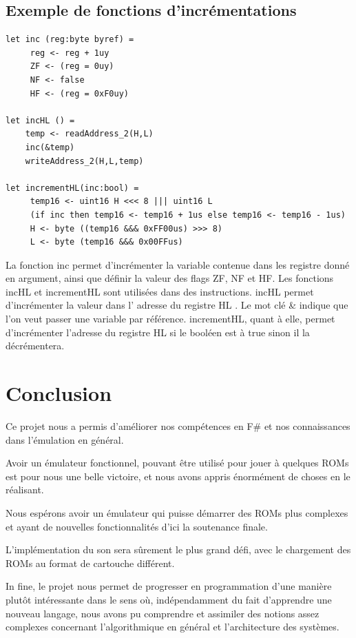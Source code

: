 \documentclass[12pt, a4paper]{article}
\begin{document}
\bigskip

\subsection{Exemple de fonctions d'incrémentations}
\small { \begin{lstlisting}[frame = single]
let inc (reg:byte byref) =
     reg <- reg + 1uy
     ZF <- (reg = 0uy) 
     NF <- false
     HF <- (reg = 0xF0uy)
     
let incHL () =
    temp <- readAddress_2(H,L)
    inc(&temp) 
    writeAddress_2(H,L,temp)

let incrementHL(inc:bool) =
     temp16 <- uint16 H <<< 8 ||| uint16 L 
     (if inc then temp16 <- temp16 + 1us else temp16 <- temp16 - 1us) 
     H <- byte ((temp16 &&& 0xFF00us) >>> 8) 
     L <- byte (temp16 &&& 0x00FFus)
\end{lstlisting}} 
\bigskip

\large
La fonction inc permet d'incrémenter la variable contenue dans les registre donné en argument, ainsi que définir la valeur des flags ZF, NF et HF. 
Les fonctions incHL et incrementHL sont utilisées dans des instructions.
incHL permet d'incrémenter la valeur dans l' adresse du registre HL . Le mot clé \& indique que l'on veut passer une variable par référence. incrementHL, quant à elle, permet d'incrémenter l'adresse du registre HL si le booléen est à true sinon il la décrémentera.

\pagebreak

\section{Conclusion}
Ce projet nous a permis d'améliorer nos compétences en F\# et nos connaissances dans l'émulation en général.

\bigskip
Avoir un émulateur fonctionnel, pouvant être utilisé pour jouer à quelques ROMs est pour nous une belle victoire, et nous avons appris énormément de choses en le réalisant.

\bigskip
Nous espérons avoir un émulateur qui puisse démarrer des ROMs plus complexes et ayant de nouvelles fonctionnalités d'ici la soutenance finale.

\bigskip 
L'implémentation du son sera sûrement le plus grand défi, avec le chargement des ROMs au format de cartouche différent.

\bigskip
In fine, le projet nous permet de progresser en programmation d'une manière plutôt intéressante dans le sens où, indépendamment du fait d'apprendre une nouveau langage, nous avons pu comprendre et assimiler des notions assez complexes concernant l'algorithmique en général et l'architecture des systèmes.
\end{document}
